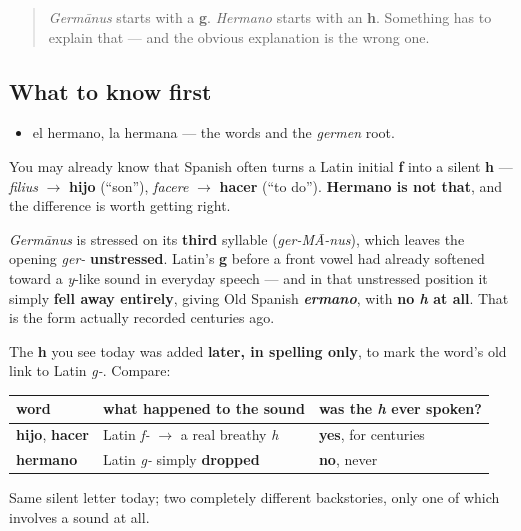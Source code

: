 \label{lesson:ES-C23-hermano-hache}



\begin{quote}
\emph{Germānus} starts with a \textbf{g}. \emph{Hermano} starts with an \textbf{h}. Something has to explain that — and the obvious explanation is the wrong one.
\end{quote}

\subsection*{What to know first}
\begin{itemize}
\raggedright
  \item el hermano, la hermana — the words and the \emph{germen} root.
\end{itemize}

\begin{culture}
You may already know that Spanish often turns a Latin initial \textbf{f} into a silent \textbf{h} — \emph{filius} $\to$ \textbf{hijo} (\textquotedblleft{}son\textquotedblright{}), \emph{facere} $\to$ \textbf{hacer} (\textquotedblleft{}to do\textquotedblright{}). \textbf{Hermano is not that}, and the difference is worth getting right.

\emph{Germānus} is stressed on its \textbf{third} syllable (\emph{ger-MĀ-nus}), which leaves the opening \emph{ger-} \textbf{unstressed}. Latin's \textbf{g} before a front vowel had already softened toward a \emph{y}-like sound in everyday speech — and in that unstressed position it simply \textbf{fell away entirely}, giving Old Spanish \emph{\textbf{ermano}}, with \textbf{no \emph{h} at all}. That is the form actually recorded centuries ago.

The \textbf{h} you see today was added \textbf{later, in spelling only}, to mark the word's old link to Latin \emph{g-}. Compare:

\noindent
\begin{tabularx}{\linewidth}{@{}>{\raggedright\arraybackslash}X>{\raggedright\arraybackslash}X>{\raggedright\arraybackslash}X@{}}
\toprule
\textbf{word} & \textbf{what happened to the sound} & \textbf{was the \emph{h} ever spoken?} \\
\midrule
\textbf{hijo}, \textbf{hacer} & Latin \emph{f-} $\to$ a real breathy \emph{h} & \textbf{yes}, for centuries \\
\textbf{hermano} & Latin \emph{g-} simply \textbf{dropped} & \textbf{no}, never \\
\bottomrule
\end{tabularx}

Same silent letter today; two completely different backstories, only one of which involves a sound at all.
\end{culture}


